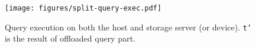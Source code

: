 \begin{figure}[t]
	\centering
	\texttt{[image: figures/split-query-exec.pdf]}
	\caption{\label{fig:split-query-exec} Query execution on both the host and storage server (or device).  \texttt{t'} is the result of offloaded query part.}
\end{figure}